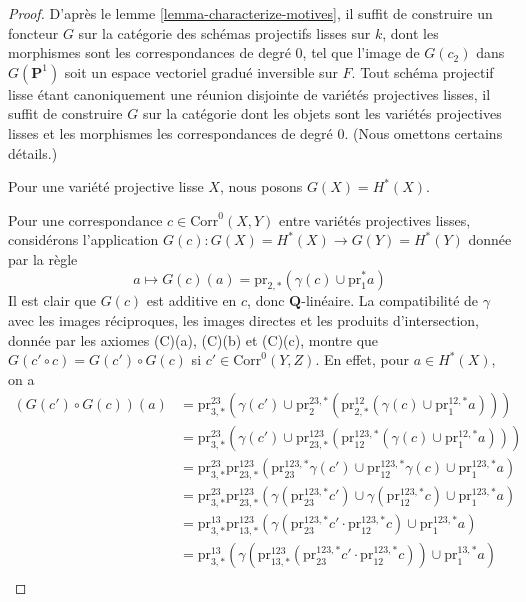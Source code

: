 \begin{proof}
D'après le lemme \ref{lemma-characterize-motives}, il suffit de construire un foncteur
$G$ sur la catégorie des schémas projectifs lisses sur $k$,
dont les morphismes sont les correspondances de degré $0$, tel que
l'image de $G(c_2)$ dans $G(\mathbf{P}^1)$ soit un espace vectoriel gradué
inversible sur $F$.
Tout schéma projectif lisse étant canoniquement une réunion
disjointe de variétés projectives lisses, il suffit de construire
$G$ sur la catégorie dont les objets sont les variétés projectives lisses
et les morphismes les correspondances de degré $0$.
(Nous omettons certains détails.)

\medskip\noindent
Pour une variété projective lisse $X$, nous posons $G(X) = H^*(X)$.

\medskip\noindent
Pour une correspondance $c \in \text{Corr}^0(X, Y)$ entre variétés projectives
lisses, considérons l'application
$G(c) : G(X) = H^*(X) \to G(Y) = H^*(Y)$ donnée par la règle
$$
a \longmapsto
G(c)(a) = \text{pr}_{2, *}(\gamma(c) \cup \text{pr}_1^*a)
$$
Il est clair que $G(c)$ est additive en $c$, donc $\mathbf{Q}$-linéaire.
La compatibilité de $\gamma$ avec les images réciproques, les images directes
et les produits d'intersection, donnée par les axiomes (C)(a), (C)(b) et (C)(c),
montre que
$G(c' \circ c) = G(c') \circ G(c)$ si $c' \in \text{Corr}^0(Y, Z)$.
En effet, pour $a \in H^*(X)$, on a
\begin{align*}
(G(c') \circ G(c))(a)
& =
\text{pr}^{23}_{3, *}(\gamma(c') \cup
\text{pr}^{23, *}_2(\text{pr}^{12}_{2, *}(\gamma(c) \cup
\text{pr}^{12, *}_1a))) \\
& =
\text{pr}^{23}_{3, *}(\gamma(c') \cup
\text{pr}^{123}_{23, *}(\text{pr}^{123, *}_{12}(\gamma(c) \cup
\text{pr}^{12, *}_1 a))) \\
& =
\text{pr}^{23}_{3, *}
\text{pr}^{123}_{23, *}(
\text{pr}^{123, *}_{23}\gamma(c') \cup
\text{pr}^{123, *}_{12}\gamma(c) \cup
\text{pr}^{123, *}_1 a) \\
& =
\text{pr}^{23}_{3, *}
\text{pr}^{123}_{23, *}(
\gamma(\text{pr}^{123, *}_{23}c') \cup
\gamma(\text{pr}^{123, *}_{12}c) \cup
\text{pr}^{123, *}_1 a) \\
& =
\text{pr}^{13}_{3, *}
\text{pr}^{123}_{13, *}(
\gamma(\text{pr}^{123, *}_{23}c' \cdot \text{pr}^{123, *}_{12}c) \cup
\text{pr}^{123, *}_1 a) \\
& =
\text{pr}^{13}_{3, *}(
\gamma(\text{pr}^{123}_{13, *}(
\text{pr}^{123, *}_{23}c' \cdot \text{pr}^{123, *}_{12}c)) \cup
\text{pr}^{13, *}_1 a) \\

\end{align*}
\end{proof}
